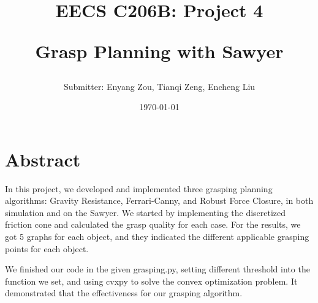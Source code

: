 \documentclass{article}
\title{EECS C206B: Project 4

Grasp Planning with Sawyer

}
\author{Submitter: Enyang Zou, Tianqi Zeng, Encheng Liu}
\date{\today}
\begin{document}
\large
\maketitle

\section{Abstract}
In this project, we developed and implemented three grasping planning algorithms: Gravity Resistance, Ferrari-Canny, and Robust Force Closure, in both simulation and on the Sawyer. We started by implementing the discretized friction cone and calculated the grasp quality for each case. For the results, we got 5 graphs for each object, and they indicated the different applicable grasping points for each object. 

We finished our code in the given grasping.py, setting different threshold into the function we set, and using cvxpy to solve the convex optimization problem. It demonstrated that the effectiveness for our grasping algorithm. 
\end{document}
